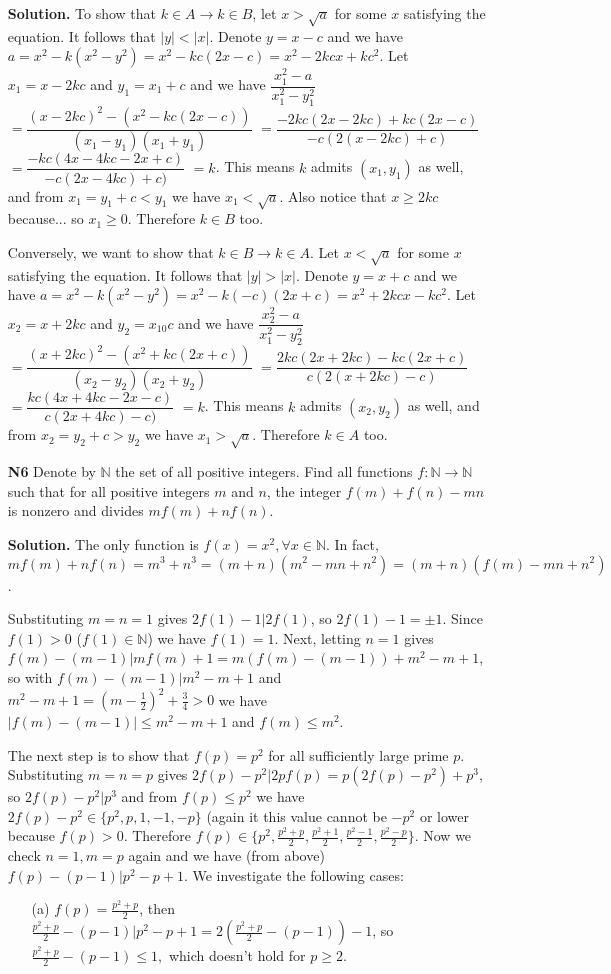 \documentclass[11pt,a4paper]{article}
\begin{document}
\begin{itemize}
\textbf{Solution.} 
To show that $k\in A\to k\in B$, let $x>\sqrt{a}$ for some $x$ satisfying the equation. 
It follows that $|y|<|x|$. 
Denote $y=x-c$ and we have $a=x^2-k(x^2-y^2)=x^2-kc(2x-c)=x^2-2kcx+kc^2$. 
Let $x_1=x-2kc$ and $y_1=x_1+c$ and we have 
$\dfrac{x_1^2-a}{x_1^2-y_1^2}$
$=\dfrac{(x-2kc)^2-(x^2-kc(2x-c))}{(x_1-y_1)(x_1+y_1)}$
$=\dfrac{-2kc(2x-2kc)+kc(2x-c)}{-c(2(x-2kc)+c)}$
$=\dfrac{-kc(4x-4kc-2x+c)}{-c(2x-4kc)+c)}$
$=k$. 
This means $k$ admits $(x_1, y_1)$ as well, and from $x_1=y_1+c<y_1$ we have $x_1<\sqrt{a}$. 
Also notice that $x\ge 2kc$ because... so $x_1\ge 0$. Therefore
$k\in B$ too. 

Conversely, we want to show that $k\in B\to k\in A$. 
Let $x<\sqrt{a}$ for some $x$ satisfying the equation. 
It follows that $|y|>|x|$. 
Denote $y=x+c$ and we have $a=x^2-k(x^2-y^2)=x^2-k(-c)(2x+c)=x^2+2kcx-kc^2$. 
Let $x_2=x+2kc$ and $y_2=x_10c$ and we have 
$\dfrac{x_2^2-a}{x_1^2-y_2^2}$
$=\dfrac{(x+2kc)^2-(x^2+kc(2x+c))}{(x_2-y_2)(x_2+y_2)}$
$=\dfrac{2kc(2x+2kc)-kc(2x+c)}{c(2(x+2kc)-c)}$
$=\dfrac{kc(4x+4kc-2x-c)}{c(2x+4kc)-c)}$
$=k$. 
This means $k$ admits $(x_2, y_2)$ as well, and from $x_2=y_2+c>y_2$ we have $x_1>\sqrt{a}$. Therefore
$k\in A$ too. 

\item[\textbf{N6}]
Denote by $\mathbb{N}$ the set of all positive integers. Find all functions $f:\mathbb{N}\rightarrow \mathbb{N}$ such that for all positive integers $m$ and $n$, the integer $f(m)+f(n)-mn$ is nonzero and divides $mf(m)+nf(n)$.

\textbf{Solution.}
The only function is $f(x)=x^2, \forall x\in\mathbb{N}$. 
In fact, $mf(m)+nf(n)=m^3+n^3=(m+n)(m^2-mn+n^2)=(m+n)(f(m)-mn+n^2)$. 

Substituting $m=n=1$ gives $2f(1)-1|2f(1)$, so $2f(1)-1=\pm 1$. 
Since $f(1) > 0$ ($f(1)\in\mathbb{N}$) we have $f(1)=1$. 
Next, letting $n=1$ gives $f(m)-(m-1)|mf(m)+1=m(f(m)-(m-1))+m^2-m+1$, 
so with $f(m)-(m-1)|m^2-m+1$ and $m^2-m+1=(m-\frac 12)^2+\frac 34 > 0$ we have 
$|f(m)-(m-1)|\le m^2-m+1$ and $f(m)\le m^2$. 

The next step is to show that $f(p)=p^2$ for all sufficiently large prime $p$. 
Substituting $m=n=p$ gives $2f(p)-p^2|2pf(p)=p(2f(p)-p^2)+p^3$, so 
$2f(p)-p^2|p^3$ and from $f(p)\le p^2$ we have 
$2f(p)-p^2\in\{p^2, p, 1, -1, -p\}$ (again it this value cannot be $-p^2$ or lower because $f(p)>0$. 
Therefore $f(p)\in\{p^2, \frac{p^2+p}2, \frac{p^2+1}2, \frac{p^2-1}2, \frac{p^2-p}2\}$. 
Now we check $n=1, m=p$ again and we have (from above) $f(p)-(p-1)|p^2-p+1$. 
We investigate the following cases: 
\begin{itemize}
\item [(a)] $f(p)=\frac{p^2+p}2$, 
then $\frac{p^2+p}2-(p-1)|p^2-p+1=2(\frac{p^2+p}2-(p-1))-1$, 
so $\frac{p^2+p}2-(p-1)\le 1, $
which doesn't hold for $p\ge 2$. 


\end{itemize}
\end{itemize}
\end{document}
